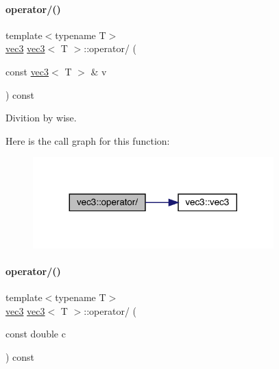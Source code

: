 \mbox{\label{structvec3_ad2f8afc304554e7b5d7331030e8bc91d}} 
\paragraph{\texorpdfstring{operator/()}{operator/()}\hspace{0.1cm}{\footnotesize\ttfamily [1/2]}}
{\footnotesize\ttfamily template$<$typename T$>$ \\
\mbox{\hyperlink{structvec3}{vec3}} \mbox{\hyperlink{structvec3}{vec3}}$<$ T $>$\+::operator/ (\begin{DoxyParamCaption}\item[{const \mbox{\hyperlink{structvec3}{vec3}}$<$ T $>$ \&}]{v }\end{DoxyParamCaption}) const\hspace{0.3cm}{\ttfamily [inline]}}



Divition by wise. 

Here is the call graph for this function\+:\nopagebreak
\begin{figure}[H]
\begin{center}
\leavevmode
\includegraphics[width=263pt]{structvec3_ad2f8afc304554e7b5d7331030e8bc91d_cgraph}
\end{center}
\end{figure}
\mbox{\label{structvec3_aefb92d2dd7d6410991dffc593e9ab874}} 
\paragraph{\texorpdfstring{operator/()}{operator/()}\hspace{0.1cm}{\footnotesize\ttfamily [2/2]}}
{\footnotesize\ttfamily template$<$typename T$>$ \\
\mbox{\hyperlink{structvec3}{vec3}} \mbox{\hyperlink{structvec3}{vec3}}$<$ T $>$\+::operator/ (\begin{DoxyParamCaption}\item[{const double}]{c }\end{DoxyParamCaption}) const\hspace{0.3cm}{\ttfamily [inline]}}



